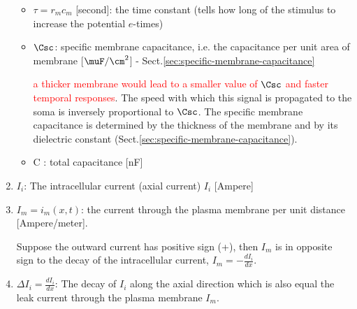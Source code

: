 \begin{enumerate}
\begin{itemize}
   \item $\tau = r_m c_m$ [second]: the time constant (tells how long
   of the stimulus to increase the potential $e$-times)
   
  \item $\Csc$: specific membrane capacitance, i.e. the
  capacitance per unit area of membrane [$\muF/\cm^2$] - Sect.\ref{sec:specific-membrane-capacitance}
  
\textcolor{red}{a thicker membrane would lead to a smaller value of $\Csc$ and
faster temporal responses}. The speed with which this signal is propagated to
the soma is inversely proportional to $\Csc$. The specific membrane capacitance
is determined by the thickness of the membrane and by its dielectric constant
(Sect.\ref{sec:specific-membrane-capacitance}).

  \item C : total capacitance [nF] 


  \end{itemize}

  \item $I_i$: The intracellular current (axial current) $I_i$ [Ampere]

  \item $I_m = i_m(x,t)$: the current through the plasma membrane per unit
  distance [Ampere/meter].
  
  Suppose the outward current has positive sign (+), then $I_m$ is in opposite
  sign to the decay of the intracellular current, $I_m = -\frac{dI_i}{dx}$.
    
  \item $\Delta I_i = \frac{dI_i}{dx}$: The decay of $I_i$ along the axial
  direction which is also equal the leak current through the plasma membrane
  $I_m$. 
  

 
\end{enumerate}

